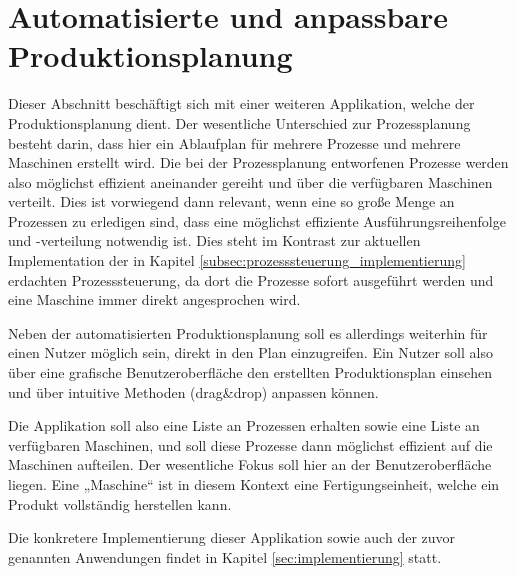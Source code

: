 \section{Automatisierte und anpassbare Produktionsplanung}
\label{sec:produktionsplanung}

Dieser Abschnitt beschäftigt sich mit einer weiteren Applikation, welche der Produktionsplanung dient. Der wesentliche Unterschied zur Prozessplanung besteht darin, dass hier ein Ablaufplan für mehrere Prozesse und mehrere Maschinen erstellt wird. Die bei der Prozessplanung entworfenen Prozesse werden also möglichst effizient aneinander gereiht und über die verfügbaren Maschinen verteilt. Dies ist vorwiegend dann relevant, wenn eine so große Menge an Prozessen zu erledigen sind, dass eine möglichst effiziente Ausführungsreihenfolge und -verteilung notwendig ist. Dies steht im Kontrast zur aktuellen Implementation der in Kapitel \ref{subsec:prozesssteuerung_implementierung} erdachten Prozesssteuerung, da dort die Prozesse sofort ausgeführt werden und eine Maschine immer direkt angesprochen wird.

Neben der automatisierten Produktionsplanung soll es allerdings weiterhin für einen Nutzer möglich sein, direkt in den Plan einzugreifen. Ein Nutzer soll also über eine grafische Benutzeroberfläche den erstellten Produktionsplan einsehen und über intuitive Methoden (drag\&drop) anpassen können.

Die Applikation soll also eine Liste an Prozessen erhalten sowie eine Liste an verfügbaren Maschinen, und soll diese Prozesse dann möglichst effizient auf die Maschinen aufteilen. Der wesentliche Fokus soll hier an der Benutzeroberfläche liegen. Eine „Maschine“ ist in diesem Kontext eine Fertigungseinheit, welche ein Produkt vollständig herstellen kann.

Die konkretere Implementierung dieser Applikation sowie auch der zuvor genannten Anwendungen findet in Kapitel \ref{sec:implementierung} statt.
